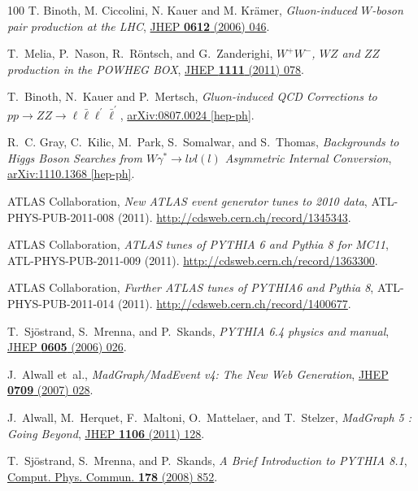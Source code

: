 \documentclass[final,3p,times,twocolumn]{elsarticle}
\begin{document}
\begin{thebibliography}{100}
{T. Binoth, M. Ciccolini, N. Kauer and M. Kr\"amer}, {\em Gluon-induced
  $W$-boson pair production at the LHC},
  \href{http://dx.doi.org/10.1088/1126-6708/2006/12/046}{JHEP {\bfseries 0612}
  (2006) 046}.

T.~Melia, P.~Nason, R.~R{\"o}ntsch, and G.~Zanderighi, {\em {$W^+W^-$, $WZ$ and
  $ZZ$ production in the POWHEG BOX}},
  \href{http://dx.doi.org/10.1007/JHEP11(2011)078}{JHEP {\bfseries 1111} (2011)
  078}.

{T.~Binoth, N.~Kauer and P.~Mertsch}, {\em {Gluon-induced QCD Corrections to
  $pp\to ZZ\to\ell\bar{\ell}\ell^\prime\bar{\ell}^\prime$}},
  \href{http://arxiv.org/abs/0807.0024}{{\ttfamily arXiv:0807.0024 [hep-ph]}}.

R.~C. Gray, C.~Kilic, M.~Park, S.~Somalwar, and S.~Thomas, {\em {Backgrounds to
  Higgs Boson Searches from $W \gamma^{\ast} \to l \nu l (l)$ Asymmetric
  Internal Conversion}}, \href{http://arxiv.org/abs/1110.1368}{{\ttfamily
  arXiv:1110.1368 [hep-ph]}}.

{ATLAS Collaboration}, {\em {New ATLAS event generator tunes to 2010 data}},
  ATL-PHYS-PUB-2011-008 (2011). \url{http://cdsweb.cern.ch/record/1345343}.

{ATLAS Collaboration}, {\em {ATLAS tunes of PYTHIA 6 and Pythia 8 for MC11}},
  ATL-PHYS-PUB-2011-009 (2011). \url{http://cdsweb.cern.ch/record/1363300}.

{ATLAS Collaboration}, {\em {Further ATLAS tunes of PYTHIA6 and Pythia 8}},
  ATL-PHYS-PUB-2011-014 (2011). \url{http://cdsweb.cern.ch/record/1400677}.

{T.~Sj{\"o}strand, S.~Mrenna, and P.~Skands}, {\em {PYTHIA 6.4 physics and
  manual}}, \href{http://dx.doi.org/10.1088/1126-6708/2006/05/026}{JHEP
  {\bfseries 0605} (2006) 026}.

J.~Alwall {et~al.}, {\em {MadGraph/MadEvent v4: The New Web Generation}},
  \href{http://dx.doi.org/10.1088/1126-6708/2007/09/028}{JHEP {\bfseries 0709}
  (2007) 028}.

J.~Alwall, M.~Herquet, F.~Maltoni, O.~Mattelaer, and T.~Stelzer, {\em {MadGraph
  5 : Going Beyond}}, \href{http://dx.doi.org/10.1007/JHEP06(2011)128}{JHEP
  {\bfseries 1106} (2011) 128}.

T.~Sj{\"o}strand, S.~Mrenna, and P.~Skands, {\em {A Brief Introduction to PYTHIA
  8.1}}, \href{http://dx.doi.org/10.1016/j.cpc.2008.01.036}{Comput. Phys.
  Commun. {\bfseries 178} (2008) 852}.


\end{thebibliography}
\end{document}
